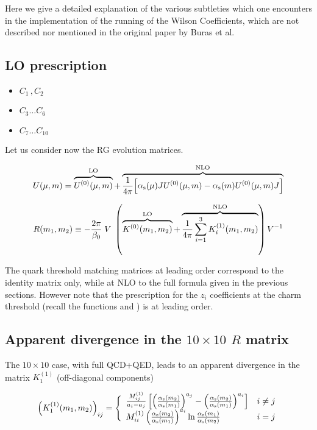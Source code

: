 
Here we give a detailed explanation of the various 
subtleties which one encounters in the implementation
of the running of the Wilson Coefficients, which are 
not described nor mentioned in the original paper 
by Buras et al.

\subsection{LO prescription}

\begin{itemize}
\item $C_1 \,, C_2$ \\

\item $C_3 \ldots C_6$ \\

\item $C_7 \ldots C_{10}$ \\
\end{itemize}

Let us consider now the RG evolution matrices.

\begin{equation}
U(\mu,m)= \overbrace{U^{(0)}(\mu,m)}^\text{LO} + 
\overbrace{ {1 \over 4\pi} \Big[ \alpha_{\rm s}(\mu) J U^{(0)}(\mu,m) - \alpha_{\rm s}(m) U^{(0)}(\mu,m) J \Big] }^\text{NLO}
\end{equation}
 
\begin{equation}
R(m_1,m_2) \equiv -\frac{2\pi}{\beta_0} \; V \; \left(
\overbrace{K^{(0)}(m_1,m_2)}^\text{LO} +
\overbrace{\frac{1}{4\pi} \sum_{i=1}^{3} K_i^{(1)}(m_1,m_2)}^\text{NLO} \right) V^{-1}
\end{equation}

The quark threshold matching matrices at leading order correspond to the 
identity matrix only, while at NLO to the full formula given in the previous sections.
However note that the prescription for the $z_i$ coefficients at the charm threshold 
(recall the functions  and ) is at leading order.

\subsection{Apparent divergence in the $10 \times 10$ $R$ matrix}

The $10 \times 10$ case, with full QCD+QED, leads to an apparent
divergence in the matrix $K_1^{(1)}$ (off-diagonal components)

\begin{equation}
\left( K_1^{(1)}(m_1,m_2) \right)_{ij} =
\Bigg\lbrace
\begin{array}{ll}
\frac{M^{(1)}_{ij}}{a_i - a_j}
\left[ \left( \frac{\alpha_{\rm s}(m_2)}{\alpha_{\rm s}(m_1)} \right)^{a_j} -
       \left( \frac{\alpha_{\rm s}(m_2)}{\alpha_{\rm s}(m_1)} \right)^{a_i} \right] & i \not= j \\
M^{(1)}_{ii} \left( \frac{\alpha_{\rm s}(m_2)}{\alpha_{\rm s}(m_1)} \right)^{a_i}
             \ln\frac{\alpha_{\rm s}(m_1)}{\alpha_{\rm s}(m_2)}             & i=j
\end{array} 
\end{equation}

